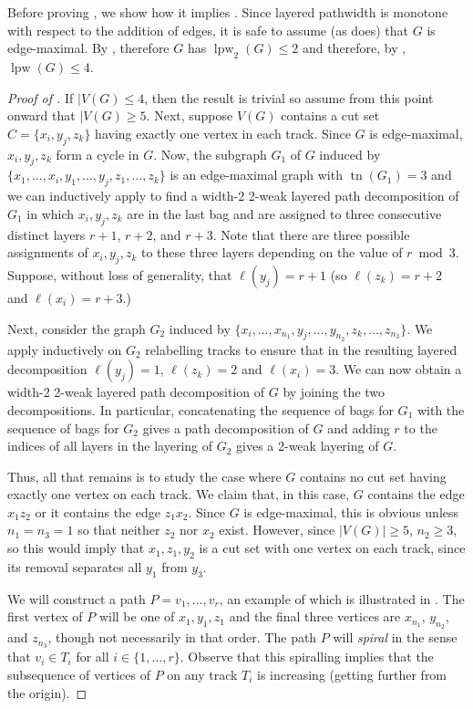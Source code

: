 \documentclass{patmorin}
\DeclareMathOperator{\tr}{tn}
\DeclareMathOperator{\lpw}{lpw}
\begin{document}
Before proving , we show how it implies .
Since layered pathwidth is monotone with respect to the addition of edges,
it is safe to assume (as  does) that $G$ is edge-maximal.
By , therefore $G$ has $\lpw_2(G)\le2$ and therefore, by
, $\lpw(G)\le 4$.

\begin{proof}[Proof of ]
  If $|V(G)\le 4$, then the result is trivial so assume from this point onward that $|V(G)\ge 5$.  Next, suppose $V(G)$ contains
  a cut set $C=\{x_i,y_j,z_k\}$ having exactly one vertex in each track.
  Since $G$ is edge-maximal, $x_i,y_j,z_k$ form a cycle in $G$.  Now,
  the subgraph $G_1$ of $G$ induced by $\{x_1,\ldots,x_i, y_1,\ldots,y_j,
  z_1,\ldots,z_k\}$ is an edge-maximal graph with $\tr(G_1)=3$ and we
  can inductively apply  to find a width-2 2-weak layered
  path decomposition of $G_1$ in which $x_i,y_j,z_k$ are in the last bag
  and are assigned to three consecutive distinct layers $r+1$, $r+2$, and $r+3$.
  Note that there are three possible assignments of $x_i,y_j,z_k$ to
  these three layers depending on the value of $r\bmod 3$.  Suppose,
  without loss of generality, that $\ell(y_j)=r+1$ (so $\ell(z_k)=r+2$
  and $\ell(x_i)=r+3$.)

  Next, consider the graph $G_2$ induced by
  $\{x_i,\ldots,x_{n_1},y_j,\ldots,y_{n_2},z_k,\ldots,z_{n_3}\}$.
  We apply  inductively on $G_2$ relabelling tracks to
  ensure that in the resulting layered decomposition $\ell(y_j)=1$,
  $\ell(z_k)=2$ and $\ell(x_i)=3$.   We can now obtain a width-2 2-weak
  layered path decomposition of $G$ by joining the two decompositions.
  In particular, concatenating the sequence of bags for $G_1$ with
  the sequence of bags for $G_2$ gives a path decomposition of $G$
  and adding $r$ to the indices of all layers in the layering of $G_2$
  gives a 2-weak layering of $G$.

  Thus, all that remains is to study the case where $G$ contains no cut
  set having exactly one vertex on each track.  We claim that, in this
  case, $G$ contains the edge $x_1z_2$ or it contains the edge $z_1x_2$.
  Since $G$ is edge-maximal, this is obvious unless $n_1=n_3=1$ so
  that neither $z_2$ nor $x_2$ exist.  However, since $|V(G)|\ge 5$, $n_2\ge 3$, so  this would imply that $x_1,z_1,y_2$ is a cut set with one vertex on
  each track, since its removal separates all $y_1$ from $y_3$.

  We will construct a path $P=v_1,\ldots,v_r$, an example of which is illustrated in . The first vertex of $P$ will be one of
  $x_1,y_1,z_1$ and the final three vertices are $x_{n_1}$,
  $y_{n_2}$, and $z_{n_3}$, though not necessarily in that order.
  The path $P$ will \emph{spiral} in the sense that $v_i\in T_i$
  for all $i\in\{1,\ldots,r\}$.  Observe that this spiralling implies that the subsequence of vertices of $P$ on any track $T_i$ is increasing (getting further from the origin).


\end{proof}
\end{document}
